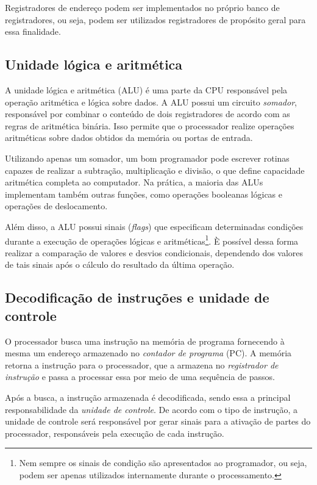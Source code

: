 \documentclass[11pt,a4paper]{report}
\begin{document}
Registradores de endereço podem ser implementados no próprio banco de
registradores, ou seja, podem ser utilizados registradores de propósito
geral para essa finalidade.

\subsection{Unidade lógica e aritmética}

A unidade lógica e aritmética (ALU) é uma parte da CPU responsável pela
operação aritmética e lógica sobre dados. A ALU possui um circuito
\textit{somador}, responsável por combinar o conteúdo de dois registradores
de acordo com as regras de aritmética binária. Isso permite que o
processador realize operações aritméticas sobre dados obtidos da memória
ou portas de entrada.

Utilizando apenas um somador, um bom programador pode escrever rotinas
capazes de realizar a subtração, multiplicação e divisão, o que define
capacidade aritmética completa ao computador. Na prática, a maioria das
ALUs implementam também outras funções, como operações booleanas lógicas
e operações de deslocamento.

Além disso, a ALU possui sinais (\textit{flags}) que especificam
determinadas condições durante a execução de operações lógicas e
aritméticas\footnote{Nem sempre os sinais de condição são apresentados
ao programador, ou seja, podem ser apenas utilizados internamente
durante o processamento.}. È possível dessa forma realizar a comparação
de valores e desvios condicionais, dependendo dos valores de tais sinais
após o cálculo do resultado da última operação.

\subsection{Decodificação de instruções e unidade de controle}

O processador busca uma instrução na memória de programa fornecendo à
mesma um endereço armazenado no \textit{contador de programa} (PC).
A memória retorna a instrução para o processador, que a armazena no
\textit{registrador de instrução} e passa a processar essa por meio
de uma sequência de passos.

Após a busca, a instrução armazenada é decodificada, sendo essa a
principal responsabilidade da \textit{unidade de controle}. De acordo
com o tipo de instrução, a unidade de controle será responsável por
gerar sinais para a ativação de partes do processador, responsáveis
pela execução de cada instrução.
\end{document}
